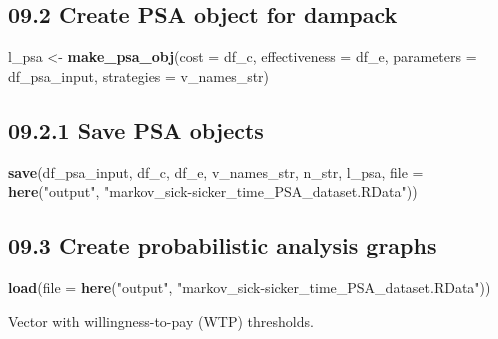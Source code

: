 \documentclass[
]{article}
\newenvironment{Shaded}{\begin{snugshade}}{\end{snugshade}}
\newcommand{\DataTypeTok}[1]{\textcolor[rgb]{0.13,0.29,0.53}{#1}}
\newcommand{\KeywordTok}[1]{\textcolor[rgb]{0.13,0.29,0.53}{\textbf{#1}}}
\newcommand{\NormalTok}[1]{#1}
\newcommand{\StringTok}[1]{\textcolor[rgb]{0.31,0.60,0.02}{#1}}
\begin{document}
\hypertarget{create-psa-object-for-dampack}{%
\subsection{09.2 Create PSA object for
dampack}\label{create-psa-object-for-dampack}}

\begin{Shaded}
\begin{Highlighting}[]
\NormalTok{l_psa <-}\StringTok{ }\KeywordTok{make_psa_obj}\NormalTok{(}\DataTypeTok{cost          =}\NormalTok{ df_c, }
                      \DataTypeTok{effectiveness =}\NormalTok{ df_e, }
                      \DataTypeTok{parameters    =}\NormalTok{ df_psa_input, }
                      \DataTypeTok{strategies    =}\NormalTok{ v_names_str)}
\end{Highlighting}
\end{Shaded}

\hypertarget{save-psa-objects}{%
\subsection{09.2.1 Save PSA objects}\label{save-psa-objects}}

\begin{Shaded}
\begin{Highlighting}[]
\KeywordTok{save}\NormalTok{(df_psa_input, df_c, df_e, v_names_str, n_str,}
\NormalTok{     l_psa,}
     \DataTypeTok{file =} \KeywordTok{here}\NormalTok{(}\StringTok{"output"}\NormalTok{, }\StringTok{"markov_sick-sicker_time_PSA_dataset.RData"}\NormalTok{))}
\end{Highlighting}
\end{Shaded}

\hypertarget{create-probabilistic-analysis-graphs}{%
\subsection{09.3 Create probabilistic analysis
graphs}\label{create-probabilistic-analysis-graphs}}

\begin{Shaded}
\begin{Highlighting}[]
\KeywordTok{load}\NormalTok{(}\DataTypeTok{file =} \KeywordTok{here}\NormalTok{(}\StringTok{"output"}\NormalTok{, }\StringTok{"markov_sick-sicker_time_PSA_dataset.RData"}\NormalTok{))}
\end{Highlighting}
\end{Shaded}

Vector with willingness-to-pay (WTP) thresholds.
\end{document}
